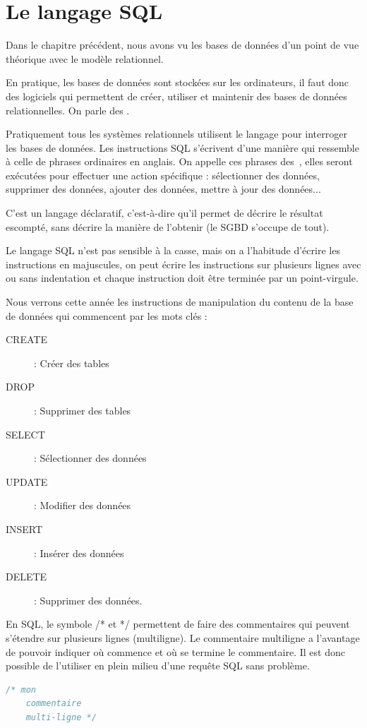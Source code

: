 \chapter*{Le langage SQL}
\setcounter{chapter}{1}
\setcounter{Exercise}{0}
Dans le chapitre précédent, nous avons vu les bases de données d'un point de vue théorique avec le modèle relationnel.

En pratique, les bases de données sont stockées sur les ordinateurs, il faut donc des logiciels qui permettent de créer, utiliser et maintenir des bases de données relationnelles.
On parle des .

Pratiquement tous les systèmes relationnels utilisent le langage  pour interroger les bases de données. 
Les instructions SQL s’écrivent d’une manière qui ressemble à celle de phrases ordinaires en anglais. 
On appelle ces phrases des~, elles seront exécutées pour effectuer une action spécifique : sélectionner des données, supprimer des données, ajouter des données, mettre à jour des données...

C’est un langage déclaratif, c’est-à-dire qu’il permet de décrire le résultat escompté, sans décrire la manière de l’obtenir (le SGBD s'occupe de tout).

\begin{Astuce} 
    Le langage SQL n’est pas sensible à la casse, mais on a l’habitude d’écrire les instructions en majuscules, on peut écrire les instructions sur plusieurs lignes avec ou sans indentation et chaque instruction doit être terminée par un point-virgule.
\end{Astuce}

Nous verrons cette année les instructions de manipulation du contenu de la base de données qui commencent par les mots clés :
\begin{description}
    \item[CREATE]: Créer des tables
    \item[DROP]: Supprimer des tables
    \item[SELECT]: Sélectionner des données
    \item[UPDATE]: Modifier des données
    \item[INSERT]: Insérer des données
    \item[DELETE]: Supprimer des données.
\end{description}

\begin{Astuce}
    En SQL, le symbole /* et */ permettent de faire des commentaires qui peuvent s'étendre sur plusieurs lignes (multiligne).
    Le commentaire multiligne a l’avantage de pouvoir indiquer où commence et où se termine le commentaire. Il est donc possible de l’utiliser en plein milieu d’une requête SQL sans problème.
\begin{lstlisting}[style=SQLstyle, language=SQL]
    /* mon
    commentaire
    multi-ligne */
\end{lstlisting}
\end{Astuce}

